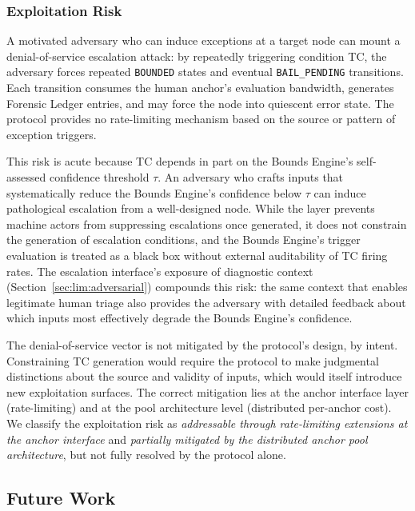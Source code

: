 \subsubsection{Exploitation Risk}
\label{sec:lim:exploitation}

A motivated adversary who can induce exceptions at a target \bxthree{} node can mount a denial-of-service escalation attack: by repeatedly triggering condition TC, the adversary forces repeated \texttt{BOUNDED} states and eventual \texttt{BAIL\_PENDING} transitions. Each transition consumes the human anchor's evaluation bandwidth, generates Forensic Ledger entries, and may force the node into quiescent error state. The protocol provides no rate-limiting mechanism based on the source or pattern of exception triggers.

This risk is acute because TC depends in part on the Bounds Engine's self-assessed confidence threshold $\tau$. An adversary who crafts inputs that systematically reduce the Bounds Engine's confidence below $\tau$ can induce pathological escalation from a well-designed node. While the \fact{} layer prevents machine actors from suppressing escalations once generated, it does not constrain the generation of escalation conditions, and the Bounds Engine's trigger evaluation is treated as a black box without external auditability of TC firing rates. The escalation interface's exposure of diagnostic context (Section~\ref{sec:lim:adversarial}) compounds this risk: the same context that enables legitimate human triage also provides the adversary with detailed feedback about which inputs most effectively degrade the Bounds Engine's confidence.

The denial-of-service vector is not mitigated by the protocol's design, by intent. Constraining TC generation would require the protocol to make judgmental distinctions about the source and validity of inputs, which would itself introduce new exploitation surfaces. The correct mitigation lies at the anchor interface layer (rate-limiting) and at the pool architecture level (distributed per-anchor cost). We classify the exploitation risk as \emph{addressable through rate-limiting extensions at the anchor interface} and \emph{partially mitigated by the distributed anchor pool architecture}, but not fully resolved by the protocol alone.

\subsection{Future Work}\label{sec:future-work}

